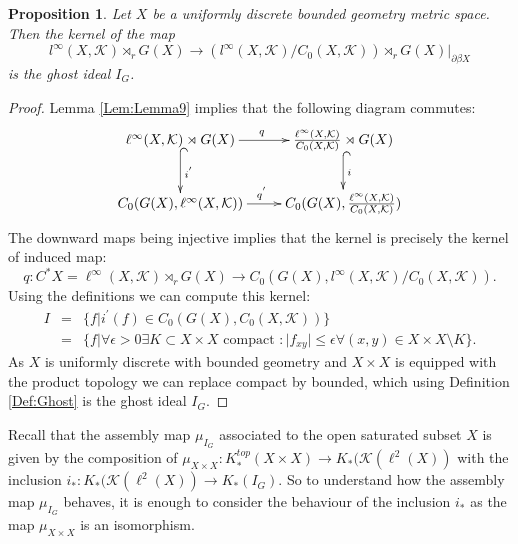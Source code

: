 \documentclass[11pt]{amsart}
\theoremstyle{plain}
\newtheorem{proposition}[theorem]{Proposition}%
\theoremstyle{definition}%
\theoremstyle{remark}%
\begin{document}
\begin{proposition}
Let $X$ be a uniformly discrete bounded geometry metric space. Then the kernel of the map
\begin{equation*}
l^{\infty}(X,\mathcal{K})\rtimes_{r}G(X) \rightarrow (l^{\infty}(X,\mathcal{K})/C_{0}(X,\mathcal{K}))\rtimes_{r}G(X)|_{\partial\beta X}
\end{equation*}
is the ghost ideal $I_{G}$.
\end{proposition}
\begin{proof}
Lemma \ref{Lem:Lemma9} implies that the following diagram commutes:
\begin{equation*}
\xymatrix{\ell^{\infty}(X,\mathcal{K})\rtimes G(X) \ar@{->}[r]^{q} \ar@{^{(}->}[d]^{i^{'}} &\frac{\ell^{\infty}(X,\mathcal{K})}{C_{0}(X,\mathcal{K})}\rtimes G(X) \ar@{^{(}->}[d]^{i}\\
C_{0}(G(X),\ell^{\infty}(X,\mathcal{K}))\ar@{->}[r]^{q^{'}} &   C_{0}(G(X),\frac{\ell^{\infty}(X,\mathcal{K})}{C_{0}(X,\mathcal{K})})
}
\end{equation*}
The downward maps being injective implies that the kernel is precisely the kernel of induced map:
\begin{equation*}
q:C^{*}X=\ell^{\infty}(X,\mathcal{K})\rtimes_{r}G(X) \rightarrow C_{0}(G(X),l^{\infty}(X,\mathcal{K})/C_{0}(X,\mathcal{K})).
\end{equation*}
Using the definitions we can compute this kernel:
\begin{eqnarray*}
I & =&  \lbrace f | i^{'}(f) \in C_{0}(G(X),C_{0}(X,\mathcal{K}))\rbrace \\
& = & \lbrace f | \forall \epsilon > 0 \exists K \subset X \times X \mbox{ compact }: \vert f_{xy} \vert \leq \epsilon \forall (x,y) \in X\times X \setminus K \rbrace.
\end{eqnarray*}
As $X$ is uniformly discrete with bounded geometry and $X \times X$ is equipped with the product topology we can replace compact by bounded, which using Definition \ref{Def:Ghost} is the ghost ideal $I_{G}$.
\end{proof}
Recall that the assembly map $\mu_{I_{G}}$ associated to the open saturated subset $X$ is given by the composition of $\mu_{X \times X}: K^{top}_{*}(X\times X) \rightarrow K_{*}(\mathcal{K}(\ell^{2}(X))$ with the inclusion $i_{*}:K_{*}(\mathcal{K}(\ell^{2}(X)) \rightarrow K_{*}(I_{G})$. So to understand how the assembly map $\mu_{I_{G}}$ behaves, it is enough to consider the behaviour of the inclusion $i_{*}$ as the map $\mu_{X \times X}$ is an isomorphism.
\end{document}
